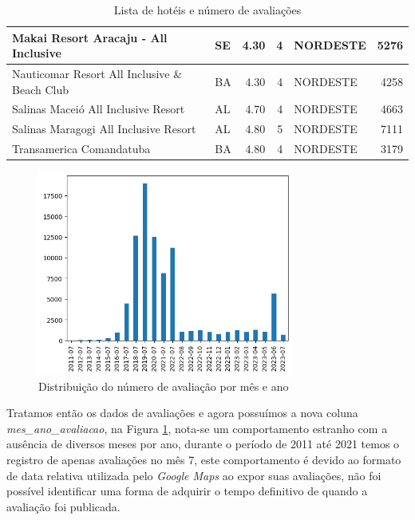 \begin{table}[]
\begin{tabular}{|p{5cm}|l|r|r|l|r|}
		Makai Resort Aracaju - All Inclusive          & SE              & 4.30          & 4                 & NORDESTE        & 5276                \\\hline
		Nauticomar Resort All Inclusive \& Beach Club & BA              & 4.30          & 4                 & NORDESTE        & 4258                \\\hline
		Salinas Maceió All Inclusive Resort           & AL              & 4.70          & 4                 & NORDESTE        & 4663                \\\hline
		Salinas Maragogi All Inclusive Resort         & AL              & 4.80          & 5                 & NORDESTE        & 7111                \\\hline
		Transamerica Comandatuba                      & BA              & 4.80          & 4                 & NORDESTE        & 3179                \\\hline
	\end{tabular}%
	\caption{Lista de hotéis e número de avaliações}
	\label{table:lista_hoteis}
\end{table}

\begin{figure}
	\centering
	\includegraphics[width=0.75\textwidth]{figs/exploratoria/distribuicao_ano_mes_avaliacao.png}
	\caption{Distribuição do número de avaliação por mês e ano}
	\label{img:dist_ano_mes_avaliacao}
\end{figure}

Tratamos então os dados de avaliações e agora possuímos a nova coluna \textit{mes\_ano\_avaliacao}, na Figura \ref{img:dist_ano_mes_avaliacao}, nota-se um comportamento estranho com a ausência de diversos meses por ano, durante o período de 2011 até 2021 temos o registro de apenas avaliações no mês 7, este comportamento é devido ao formato de data relativa utilizada pelo \textit{Google Maps} ao expor suas avaliações, não foi possível identificar uma forma de adquirir o tempo definitivo de quando a avaliação foi publicada.

